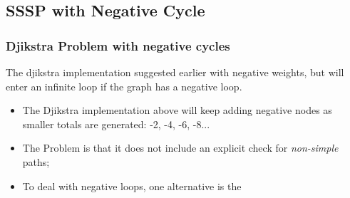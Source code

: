 \documentclass{beamer}
\begin{document}
\subsection{SSSP with Negative Cycle}
\begin{frame}
  \frametitle{Djikstra Problem with negative cycles}

  {\smaller
    \begin{block}{}
      The djikstra implementation suggested earlier 
      with negative weights, but will enter an infinite loop if the graph
      has a \alert{negative loop}.
    \end{block}

    \begin{center}
    \end{center}
    
    \begin{itemize}
    \item The Djikstra implementation above will keep adding negative
      nodes as smaller totals are generated: -2, -4, -6, -8...
    \item The Problem is that it does not include an explicit check
      for \emph{non-simple} paths;
    \item To deal with negative loops, one alternative is the
    \end{itemize}
  }
\end{frame}
\end{document}
